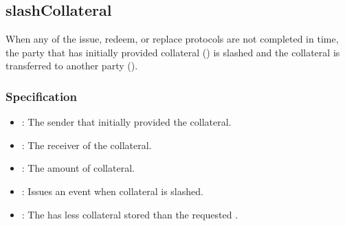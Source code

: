\documentclass[a4paper,10pt,english]{sphinxmanual}
\begin{document}
\subsection{slashCollateral}
\label{\detokenize{spec/collateral:slashcollateral}}\label{\detokenize{spec/collateral:id6}}
When any of the issue, redeem, or replace protocols are not completed in time, the party that has initially provided collateral () is slashed and the collateral is transferred to another party ().


\subsubsection{Specification}
\label{\detokenize{spec/collateral:id7}}


\begin{itemize}
\item {} 
: The sender that initially provided the collateral.

\item {} 
: The receiver of the collateral.

\item {} 
: The amount of collateral.

\end{itemize}

\begin{itemize}
\item {} 
: Issues an event when collateral is slashed.

\end{itemize}

\begin{itemize}
\item {} 
: The  has less collateral stored than the requested .

\end{itemize}
\end{document}
